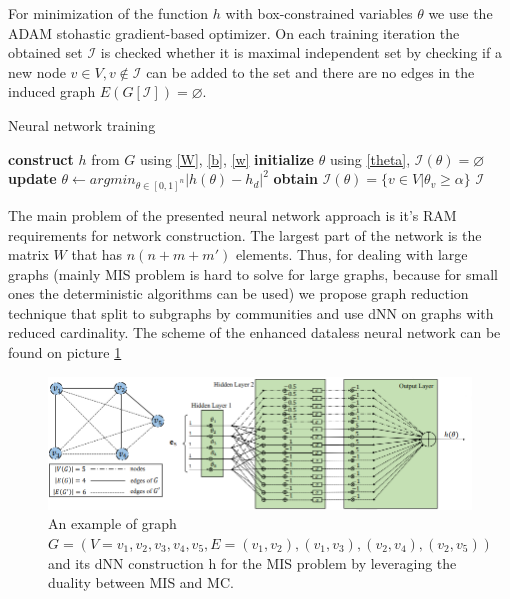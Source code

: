 For minimization of the function $h$ with box-constrained variables $\theta$ we use the ADAM stohastic gradient-based optimizer.
On each training iteration the obtained set $\mathcal{I}$ is checked whether it is maximal independent set by checking if a new node $v \in V, v \notin \mathcal{I}$ can be added to the set and there are no edges in the induced graph $E(G[\mathcal{I}]) = \varnothing$.

\begin{algorithm}[]
\caption{Neural network training}\label{alg:neural_network}
\begin{algorithmic}
    \State \textbf{construct} $h$ from $G$ using \ref{W}, \ref{b}, \ref{w}
    \State\textbf{initialize} $\theta$ using \ref{theta}, $\mathcal{I(\theta)=\varnothing}$
    \While {$\exists v \in V \textbackslash \mathcal{I}(\theta)$ s.t. $E[G(\mathcal{I}(\theta)\cup\{v\}) \neq \varnothing$ \textbf{OR} $E(G[\mathcal{I}]) \neq \varnothing$}
        \State \textbf{update} $\theta \leftarrow argmin_{\theta \in [0,1]^n}|h(\theta)-h_d|^2$
        \State \textbf{obtain} $\mathcal{I}(\theta)=\{v\in V | \theta_v \geq \alpha \}$
    \EndWhile
    \State \Return $\mathcal{I}$
\EndFunction
\end{algorithmic}
\end{algorithm}

The main problem of the presented neural network approach is it's RAM requirements for network construction. The largest part of the network is the matrix $W$ that has $n(n+m+m')$ elements. Thus, for dealing with large graphs (mainly MIS problem is hard to solve for large graphs, because for small ones the deterministic algorithms can be used) we propose graph reduction technique that split \graphG to subgraphs by communities and use dNN on graphs with reduced cardinality.
The scheme of the enhanced dataless neural network can be found on picture \ref{fig:dnn_clique_scheme}
\begin{figure}[h]
    \centering
\includegraphics{figures/nn_clique_block_structure.png}
    \caption{An example of graph $G = (V = {v_1, v_2, v_3, v_4, v_5}, E =
{(v_1, v_2), (v_1, v_3), (v_2, v_4), (v_2, v_5)})$ and its dNN construction h for the MIS problem
by leveraging the duality between MIS and MC.
}
    \label{fig:dnn_clique_scheme}
\end{figure}

